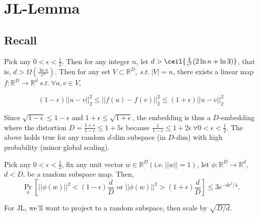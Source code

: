 \section{JL-Lemma}
\subsection{Recall}
\begin{theorem}
\noindent Pick any $0<\epsilon<\frac{1}{2}$. Then for any integer $n$,
let $d > \ceil{\frac{4}{\epsilon^2} (2\ln n + \ln 3)}$, that is, $d >
\Omega (\frac{\ln n}{\epsilon^2})$. Then for any set $V \subset
\mathbb{R}^D, \ s.t. \ |V|=n$, there exists a linear map
$f:\mathbb{R}^D \rightarrow \mathbb{R}^d \ s.t. \ \forall u,v \in V$,  

\begin{equation*}
(1-\epsilon)||u-v||^2_2 \leq ||f(u)-f(v)||_2^2 \leq
  (1+\epsilon)||u-v||^2_2 
\end{equation*}
\end{theorem}
\begin{remark} Since $\sqrt{1 - \epsilon} \leq 1 - \epsilon$ and $1 +
  \epsilon \leq \sqrt{1 + \epsilon}$, the embedding is thus a
  $D$-embedding where the distortion  $D=\frac{1+\epsilon}{1-\epsilon}
  \leq 1+5\epsilon$ because $\frac{1}{1-\epsilon} \leq 1+2\epsilon
  \ \forall 0 < \epsilon < \frac{1}{2}$. The above holds true for any
  random $d$-dim subspace (in $D$-dim) with high probability (minor
  global scaling). 
\end{remark}



\begin{lemma} \label{concentration}
Pick any $0<\epsilon<\frac{1}{2}$, fix any unit vector $w\in
\mathbb{R}^D (\mathrm{i.e.}~||w||=1)$, let
$\phi:\mathbb{R}^D\rightarrow \mathbb{R}^d$, $d<D$, be a random
subspace map. Then,  
\[\Pr_\phi \left[||\phi(w)||^2 < (1-\epsilon)\frac{d}{D} \textrm{ or }
  ||\phi (w)||^2 > (1+\epsilon)\frac{d}{D}\right]\leq 3 e^{-d
  \epsilon^2/4}.\] 
\end{lemma}

For JL, we'll want to project to a random subspace, then scale by $\sqrt{D/d}$.

